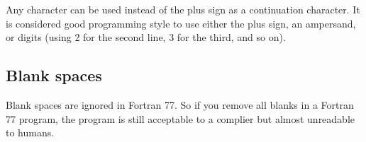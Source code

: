 Any character can be used instead of the plus sign as a continuation
character. It is considered good programming style to use either the
plus sign, an ampersand, or digits (using 2 for the second line, 3 for
the third, and so on).


\subsection*{Blank spaces}

Blank spaces are ignored in Fortran 77. So if you remove all blanks in a
Fortran 77 program, the program is still acceptable to a complier but
almost unreadable to humans.
